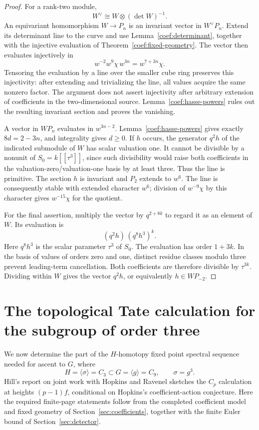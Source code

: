 \documentclass[11pt]{article}
\theoremstyle{definition}
\theoremstyle{remark}
\numberwithin{equation}{section}
\begin{document}
\begin{proof}
For a rank-two module,
\[
 W^\vee\cong W\otimes(\det W)^{-1}.
\]
An equivariant homomorphism \(W\to P_n\) is an invariant vector
in \(W^\vee P_n\).
Extend its determinant line to the curve and use
Lemma~\ref{coef:determinant}, together with the injective
evaluation of Theorem~\ref{coef:fixed-geometry}.
The vector then evaluates injectively in
\[
 w^{-2}w^9\chi\,w^{3n}=w^{7+3n}\chi.
\]
Tensoring the evaluation by a line over the smaller cube ring
preserves this injectivity: after extending and trivializing
the line, all values acquire the same nonzero factor.
The argument does not assert injectivity after arbitrary
extension of coefficients in the two-dimensional source.
Lemma~\ref{coef:hasse-powers} rules out the resulting invariant
section and proves the vanishing.

A vector in \(WP_n\) evaluates in \(w^{3n-2}\).
Lemma~\ref{coef:hasse-powers} gives exactly
\(8d=2-3n\), and integrality gives \(d\ge0\).
If \(h\) occurs, the generator \(q^2h\) of the indicated
submodule of \(W\) has scalar valuation one.
It cannot be divisible by a nonunit of \(S_0=k[[\tau^3]]\),
since such divisibility would raise both coefficients in
the valuation-zero/valuation-one basis by at least three.
Thus the line is primitive.
The section \(h\) is invariant and \(P_2\) extends to \(w^6\).
The line is consequently stable with extended character \(w^6\);
division of \(w^{-9}\chi\) by this character gives
\(w^{-15}\chi\) for the quotient.

For the final assertion, multiply the vector by \(q^{2+8k}\)
to regard it as an element of \(W\).  Its evaluation is
\[
 (q^2h)\,(q^8h^3)^k.
\]
Here \(q^8h^3\) is the scalar parameter \(\tau^3\) of \(S_0\).
The evaluation has order \(1+3k\).
In the basis of values of orders zero and one, distinct
residue classes modulo three prevent leading-term cancellation.
Both coefficients are therefore divisible by \(\tau^{3k}\).
Dividing within \(W\) gives the vector \(q^2h\), or
equivalently \(h\in WP_{-2}\).
\end{proof}

\section{The topological Tate calculation for the subgroup of order three}
\label{sec:subgroup}

We now determine the part of the $H$-homotopy fixed point spectral sequence
needed for ascent to $G$, where
\[
 H=\langle\sigma\rangle=C_3\subset G=\langle g\rangle=C_9,
 \qquad \sigma=g^3.
\]
Hill's report on joint work with Hopkins and Ravenel
\cite[pp.~2699--2700, Propositions~2--3]{Hill2007} sketches the
$C_p$ calculation at heights $(p-1)f$, conditional on Hopkins's
coefficient-action conjecture. Here the required finite-page statements
follow from the completed coefficient model and fixed geometry of
Section~\ref{sec:coefficients}, together with the finite Euler bound of
Section~\ref{sec:detector}.
\end{document}
